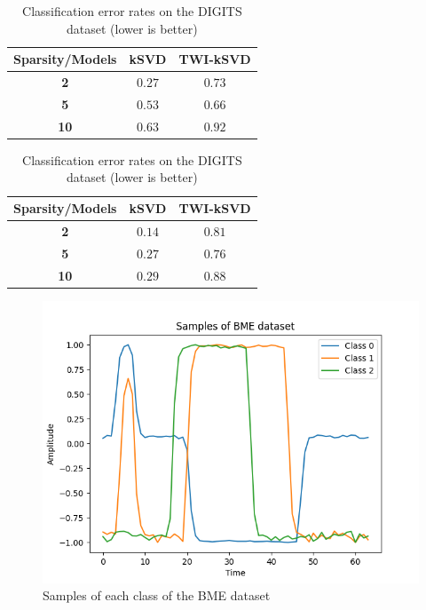 \documentclass[10pt,twocolumn,letterpaper]{article}
\begin{document}
\begin{table}[!ht]
    \begin{minipage}{.55\linewidth}
      \centering
        \begin{tabular}{ccc}
            \toprule
            \textbf{Sparsity/Models} & \textbf{kSVD} & \textbf{TWI-kSVD} \\
            \midrule
            \textbf{2} & $\bm{0.27}$ & $0.73$ \\
            \textbf{5} & $0.53$ & $0.66$ \\
            \textbf{10} & $0.63$ & $0.92$ \\
            \bottomrule
        \end{tabular}
        \caption{Original classification strategy}
    \end{minipage}
    \begin{minipage}{.35\linewidth}
      \centering
        \begin{tabular}{ccc}
            \toprule
            \textbf{Sparsity/Models} & \textbf{kSVD} & \textbf{TWI-kSVD} \\
            \midrule
            \textbf{2} & $\bm{0.14}$ & $0.81$ \\
            \textbf{5} & $0.27$ & $0.76$ \\
            \textbf{10} & $0.29$ & $0.88$ \\
            \bottomrule
        \end{tabular}
        \caption{Our classification strategy}
    \end{minipage} 
    \caption{Classification error rates on the DIGITS dataset (lower is better)}
    \label{tab:classif_results_DIGITS}
\end{table}

\begin{figure}
    \centering
    \includegraphics[scale=0.7]{../../figures/BME_samples.png}
    \caption{Samples of each class of the BME dataset} \label{fig:BME_samples}
\end{figure}
\end{document}
